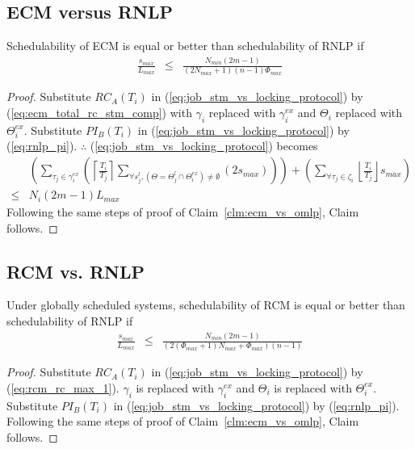 \subsection{ECM versus RNLP}\label{subsec:ecm_vs_rnlp}
%
\begin{clm}\label{clm:ecm_vs_rnlp}
%
Schedulability of ECM is equal or
better than schedulability of RNLP if 
%
\begin{eqnarray}
\frac{s_{max}}{L_{max}} & \le & \frac{N_{min}\left(2m-1\right)}{\left(2N_{max}+1\right)(n-1)\Phi_{max}}\label{eq:ecm_rnlp_cmp_final}
\end{eqnarray}
%
\end{clm}
%
\begin{proof}
%
Substitute $RC_{A}(T_{i})$ in (\ref{eq:job_stm_vs_locking_protocol})
by (\ref{eq:ecm_total_rc_stm_comp}) with $\gamma_i$ replaced with $\gamma_i^{ex}$ and $\Theta_i$ replaced with $\Theta_i^{ex}$. Substitute $PI_{B}(T_{i})$ in (\ref{eq:job_stm_vs_locking_protocol})
by (\ref{eq:rnlp_pi}). $\therefore$ (\ref{eq:job_stm_vs_locking_protocol}) becomes 
%
\begin{eqnarray}
 & \left(\sum_{\tau_{j}\in\gamma_{i}^{ex}}\left(\left\lceil\frac{T_{i}}{T_{j}}\right\rceil\sum_{\forall s_{j}^{l}, \left(\Theta=\Theta_j^l \cap \Theta_i^{ex}\right) \neq \emptyset}\left(2s_{max}\right)\right)\right) +
\left( \sum_{\forall \tau_j \in \zeta_i} \left\lfloor \frac{T_i}{T_j}\right\rfloor s_{max} \right) \nonumber \\
\le & N_{i}\left(2m-1\right)L_{max}\label{eq:ecm_rnlp_cmp_1}
\end{eqnarray}
%
Following the same steps of proof of Claim~\ref{clm:ecm_vs_omlp}, Claim follows.
%
\end{proof}
%
\subsection{RCM vs. RNLP}\label{subsec:rcm_vs_rnlp}
%
\begin{clm}\label{clm:rcm_vs_rnlp}
%
Under globally scheduled systems, schedulability of RCM is equal or
better than schedulability of RNLP if 
\begin{eqnarray}
\frac{s_{max}}{L_{max}} & \le & \frac{N_{min}\left(2m-1\right)}{\left(2\left(\Phi_{max}+1\right)N_{max}+\Phi_{max}\right)(n-1)}
\label{eq:rcm_rnlp_cmp_final}
\end{eqnarray}
%
\end{clm}
%
\begin{proof}
%
Substitute $RC_{A}(T_{i})$ in (\ref{eq:job_stm_vs_locking_protocol})
by (\ref{eq:rcm_rc_max_1}). $\gamma_i$ is replaced with $\gamma_i^{ex}$ and $\Theta_i$ is replaced with $\Theta_i^{ex}$. Substitute $PI_{B}(T_{i})$ in (\ref{eq:job_stm_vs_locking_protocol})
by (\ref{eq:rnlp_pi}). Following the same steps of proof of Claim~\ref{clm:ecm_vs_omlp}, Claim follows.
%
\end{proof}
%
